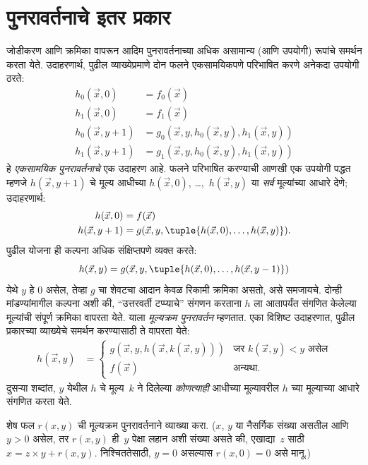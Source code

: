 \section{पुनरावर्तनाचे इतर प्रकार}\label{cmp:rec:ore:sec}

जोडीकरण आणि क्रमिका वापरून आदिम पुनरावर्तनाच्या अधिक असामान्य (आणि
उपयोगी) रूपांचे समर्थन करता येते. उदाहरणार्थ, पुढील व्याख्येप्रमाणे दोन
फलने एकसामयिकपणे परिभाषित करणे अनेकदा उपयोगी ठरते:
\begin{align*}
h_0(\vec x, 0) & = f_0(\vec x) \\
h_1(\vec x, 0) & = f_1(\vec x) \\
h_0(\vec x, y+1) & = g_0(\vec x, y, h_0(\vec x, y), h_1(\vec x, y)) \\
h_1(\vec x, y+1) & = g_1(\vec x, y, h_0(\vec x, y), h_1(\vec x, y))
\end{align*}
हे \emph{एकसामयिक पुनरावर्तनाचे} एक उदाहरण आहे. फलने परिभाषित करण्याची
आणखी एक उपयोगी पद्धत म्हणजे $h(\vec x, y+1)$ चे मूल्य आधीच्या
$h(\vec x, 0)$, \dots,~$h(\vec x, y)$ या \emph{सर्व} मूल्यांच्या आधारे
देणे; उदाहरणार्थ:
\begin{align*}
h(\vec x, 0) & = f(\vec x) \\
h(\vec x, y+1) & = g(\vec x, y, \tuple{h(\vec x, 0), \dots, h(\vec x, y)}).
\end{align*}
पुढील योजना ही कल्पना अधिक संक्षिप्तपणे व्यक्त करते:
\[h(\vec x, y) = g(\vec x, y, \tuple{h(\vec x, 0), \dots, h(\vec x, y-1)})
\]
येथे $y$ हे $0$ असेल, तेव्हा $g$ चा शेवटचा आदान केवळ रिकामी क्रमिका
असतो, असे समजायचे. दोन्ही मांडण्यांमागील कल्पना अशी की, ``उत्तरवर्ती
टप्प्याचे'' संगणन करताना $h$ ला आतापर्यंत संगणित केलेल्या मूल्यांची संपूर्ण
क्रमिका वापरता येते. याला \emph{मूल्यक्रम पुनरावर्तन} म्हणतात. एका विशिष्ट
उदाहरणात, पुढील प्रकारच्या व्याख्येचे समर्थन करण्यासाठी ते वापरता येते:
\begin{align*}
h(\vec x, y) & = \begin{cases}
  g(\vec x, y, h(\vec x, k(\vec x, y))) & \text{जर $k(\vec x, y) < y$ असेल} \\
  f(\vec x) & \text{अन्यथा.}
\end{cases}
\end{align*}
दुसऱ्या शब्दांत, $y$ येथील $h$ चे मूल्य~$k$ ने दिलेल्या \emph{कोणत्याही}
आधीच्या मूल्यावरील $h$ च्या मूल्याच्या आधारे संगणित करता येते.


\begin{prob}
  शेष फल $r(x,y)$ ची मूल्यक्रम पुनरावर्तनाने व्याख्या करा. ($x$, $y$ या
  नैसर्गिक संख्या असतील आणि $y > 0$ असेल, तर $r(x,y)$ ही~$y$ पेक्षा लहान
  अशी संख्या असते की, एखाद्या~$z$ साठी $x = z\times y + r(x,y)$. निश्चिततेसाठी,
  $y=0$ असल्यास $r(x,0) = 0$ असे मानू.)
\end{prob}


